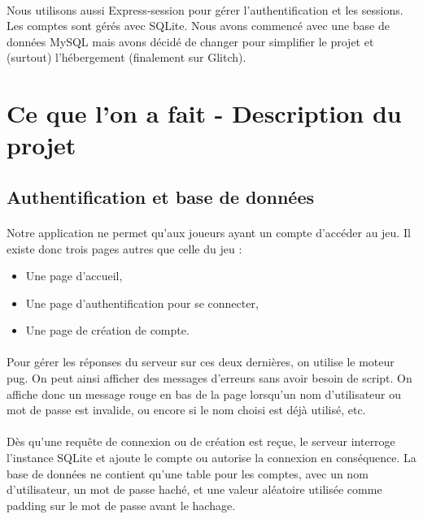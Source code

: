 \documentclass[11pt,a4paper]{article}
\begin{document}
            \paragraph{}
            Nous utilisons aussi Express-session pour gérer l'authentification et les sessions.
            Les comptes sont gérés avec SQLite.
            Nous avons commencé avec une base de données MySQL mais avons décidé de changer pour simplifier le projet et (surtout) l'hébergement (finalement sur Glitch).
    \section{Ce que l'on a fait - Description du projet}
        \subsection{Authentification et base de données}
            \paragraph{}
            Notre application ne permet qu'aux joueurs ayant un compte d'accéder au jeu.
            Il existe donc trois pages autres que celle du jeu :
            \begin{itemize}
                \item Une page d'accueil,
                \item Une page d'authentification pour se connecter,
                \item Une page de création de compte.
            \end{itemize}
            \paragraph{}
            Pour gérer les réponses du serveur sur ces deux dernières,
            on utilise le moteur pug.
            On peut ainsi afficher des messages d'erreurs sans avoir besoin de script.
            On affiche donc un message rouge en bas de la page lorsqu'un nom d'utilisateur ou mot de passe est invalide,
            ou encore si le nom choisi est déjà utilisé, etc.
            \paragraph{}
            Dès qu'une requête de connexion ou de création est reçue,
            le serveur interroge l'instance SQLite et ajoute le compte ou autorise la connexion en conséquence.
            La base de données ne contient qu'une table pour les comptes, avec un nom d'utilisateur, un mot de passe haché,
            et une valeur aléatoire utilisée comme padding sur le mot de passe avant le hachage.
\end{document}
